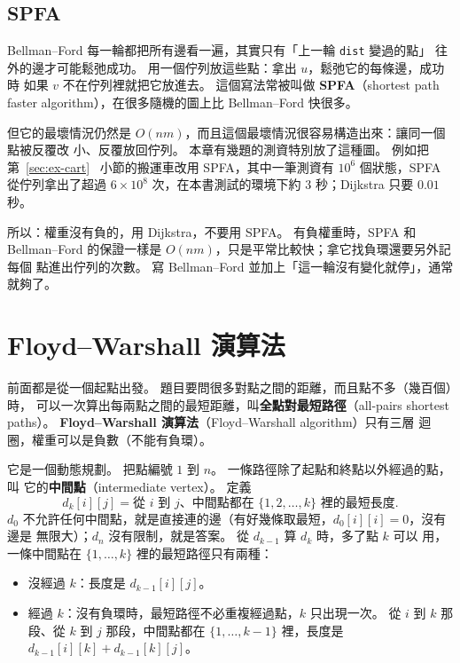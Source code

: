 \subsection{SPFA}
\label{sec:sp-spfa}

Bellman--Ford 每一輪都把所有邊看一遍，其實只有「上一輪 \texttt{dist} 變過的點」
往外的邊才可能鬆弛成功。 用一個佇列放這些點：拿出 $u$，鬆弛它的每條邊，成功時
如果 $v$ 不在佇列裡就把它放進去。 這個寫法常被叫做 \textbf{SPFA}（shortest path
faster algorithm），在很多隨機的圖上比 Bellman--Ford 快很多。

但它的最壞情況仍然是 $O(nm)$，而且這個最壞情況很容易構造出來：讓同一個點被反覆改
小、反覆放回佇列。 本章有幾題的測資特別放了這種圖。 例如把第~\ref{sec:ex-cart}~
小節的搬運車改用 SPFA，其中一筆測資有 $10^6$ 個狀態，SPFA 從佇列拿出了超過 $6
\times 10^8$ 次，在本書測試的環境下約 $3$ 秒；Dijkstra 只要 $0.01$ 秒。

所以：權重沒有負的，用 Dijkstra，不要用 SPFA。 有負權重時，SPFA 和
Bellman--Ford 的保證一樣是 $O(nm)$，只是平常比較快；拿它找負環還要另外記每個
點進出佇列的次數。 寫 Bellman--Ford 並加上「這一輪沒有變化就停」，通常就夠了。

\section{Floyd--Warshall 演算法}
\label{sec:sp-fw}

前面都是從一個起點出發。 題目要問很多對點之間的距離，而且點不多（幾百個）時，
可以一次算出每兩點之間的最短距離，叫\textbf{全點對最短路徑}（all-pairs shortest
paths）。 \textbf{Floyd--Warshall 演算法}（Floyd--Warshall algorithm）只有三層
迴圈，權重可以是負數（不能有負環）。

它是一個動態規劃。 把點編號 $1$ 到 $n$。 一條路徑除了起點和終點以外經過的點，叫
它的\textbf{中間點}（intermediate vertex）。 定義
\[
d_k[i][j] = \text{從 } i \text{ 到 } j\text{、中間點都在 } \{1, 2, \ldots, k\} \text{ 裡的最短長度}.
\]
$d_0$ 不允許任何中間點，就是直接連的邊（有好幾條取最短，$d_0[i][i] = 0$，沒有邊是
無限大）；$d_n$ 沒有限制，就是答案。 從 $d_{k-1}$ 算 $d_k$ 時，多了點 $k$ 可以
用，一條中間點在 $\{1, \ldots, k\}$ 裡的最短路徑只有兩種：

\begin{itemize}
\item 沒經過 $k$：長度是 $d_{k-1}[i][j]$。
\item 經過 $k$：沒有負環時，最短路徑不必重複經過點，$k$ 只出現一次。 從 $i$ 到 $k$
那段、從 $k$ 到 $j$ 那段，中間點都在 $\{1, \ldots, k - 1\}$ 裡，長度是
$d_{k-1}[i][k] + d_{k-1}[k][j]$。
\end{itemize}

